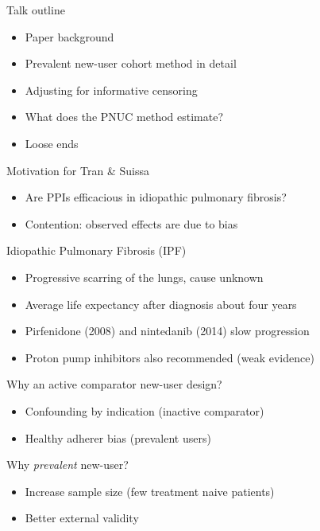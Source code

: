 \documentclass[aspectratio=169,12pt]{beamer} %
\begin{document}

\begin{frame}{Talk outline}
    \begin{itemize}
	\item Paper background
	\item Prevalent new-user cohort method in detail
	\item Adjusting for informative censoring
	\item What does the PNUC method estimate?
	\item Loose ends
    \end{itemize}
\end{frame}

\begin{frame}{Motivation for Tran \& Suissa}
    \begin{itemize}
	\item Are PPIs efficacious in idiopathic pulmonary fibrosis?
	\item Contention: observed effects are due to bias
    \end{itemize}
\end{frame}

\begin{frame}{Idiopathic Pulmonary Fibrosis (IPF)}
    \begin{itemize}
        \item Progressive scarring of the lungs, cause unknown
	\item Average life expectancy after diagnosis about four years
	\item Pirfenidone (2008) and nintedanib (2014) slow progression
	\item Proton pump inhibitors also recommended (weak evidence)
    \end{itemize}
\end{frame}

\begin{frame}{Why an active comparator new-user design?}
    \begin{itemize}
	\item Confounding by indication (inactive comparator)
	\item Healthy adherer bias (prevalent users)
    \end{itemize}
\end{frame}

\begin{frame}{Why \emph{prevalent} new-user?}
    \begin{itemize}
	\item Increase sample size (few treatment naive patients)
	\item Better external validity
    \end{itemize}
\end{frame}
\end{document}
